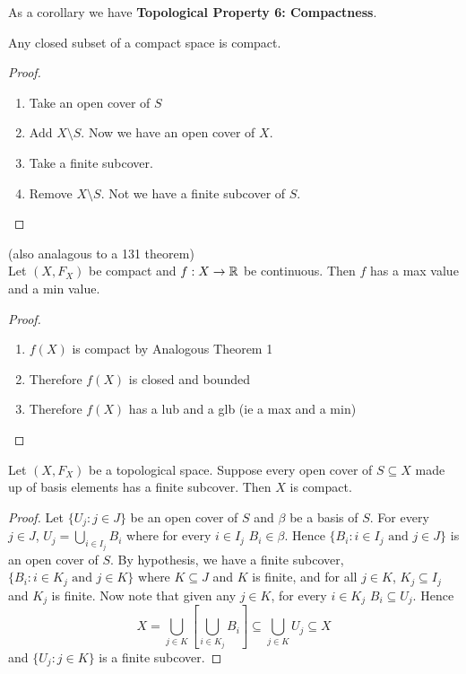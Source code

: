 As a corollary we have {\bf Topological Property 6: Compactness}.\\
\begin{theorem}
	Any closed subset of a compact space is compact. 
\end{theorem}
\begin{proof}
	\begin{enumerate}
		\item Take an open cover of $S$ 
		\item Add $X \setminus S$. Now we have an open cover of $X$. 
		\item Take a finite subcover. 
		\item Remove $X \setminus S$. Not we have a finite subcover of $S$. 
	\end{enumerate}
\end{proof}
\begin{theorem}
	(also analagous to a 131 theorem)\\
	Let $(X, F_X)$ be compact and $f : X \rightarrow \mathbb R$ be continuous. Then $f$ has a max value and a min value. 
\end{theorem}
\begin{proof}
	\begin{enumerate}
		\item $f(X)$ is compact by Analogous Theorem 1 
		\item Therefore $f(X)$ is closed and bounded 
		\item Therefore $f(X)$ has a lub and a glb (ie a max and a min) 
	\end{enumerate}
\end{proof}
\begin{smallfact}
	Let $(X, F_X)$ be a topological space. Suppose every open cover of $S \subseteq X$ made up of basis elements has a finite subcover. Then $X$ is compact. 
\end{smallfact}
\begin{proof}
	Let $\{U_j : j \in J\}$ be an open cover of $S$ and $\beta$ be a basis of $S$. For every $j \in J$, $U_j = \bigcup_{i \in I_j}B_i$ where for every $i \in I_j$ $B_i \in \beta$. Hence $\{B_i : i \in I_j \text{ and } j \in J\}$ is an open cover of $S$. By hypothesis, we have a finite subcover, $\{B_i : i \in K_j \text{ and } j \in K\}$ where $K \subseteq J$ and $K$ is finite, and for all $j \in K$, $K_j \subseteq I_j$ and $K_j$ is finite. Now note that given any $j \in K$, for every $i \in K_j$ $B_i \subseteq U_j$. Hence
	\[X = \bigcup_{j\in K} \left[ \bigcup_{i \in K_j} B_i \right] \subseteq \bigcup_{j\in K} U_j \subseteq X\]
	and $\{U_j : j\in K\}$ is a finite subcover. 
\end{proof}
